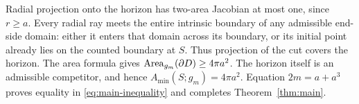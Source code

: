 Radial projection onto the horizon has two-area Jacobian at most one,
since $r\ge a$. Every radial ray meets the entire intrinsic boundary
of any admissible end-side domain: either it enters that domain
across its boundary, or its initial point already lies on the counted
boundary at $S$. Thus projection of the cut covers the horizon.
The area formula gives $\operatorname{Area}_{g_m}(\partial D)\ge4\pi a^2$.
The horizon itself is an admissible competitor, and hence
$A_{\min}(S;g_m)=4\pi a^2$. Equation $2m=a+a^3$ proves equality in
\eqref{eq:main-inequality} and completes Theorem~\ref{thm:main}.
